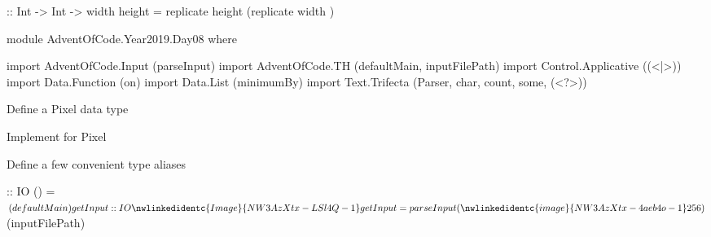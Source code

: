 \nwenddocs{}\endmoddef\nwstartdeflinemarkup{}\nwenddeflinemarkup
{} :: Int -> Int -> 
 width height = replicate height (replicate width )
\eatline
{}\nwendcode{}\nwdocspar


\nwenddocs{}\endmoddef\nwstartdeflinemarkup\nwenddeflinemarkup
module AdventOfCode.Year2019.Day08 where

import AdventOfCode.Input (parseInput)
import AdventOfCode.TH (defaultMain, inputFilePath)
import Control.Applicative ((<|>))
import Data.Function (on)
import Data.List (minimumBy)
import Text.Trifecta (Parser, char, count, some, (<?>))

\LA{}Define a Pixel data type~{\nwtagstyle{}}\RA{}

\LA{}Implement  for \code{}Pixel\edoc{}~{\nwtagstyle{}}\RA{}

\LA{}Define a few convenient type aliases~{\nwtagstyle{}}\RA{}

 :: IO ()
 = $(defaultMain)

getInput :: IO \nwlinkedidentc{Image}{NW3AzXtx-LSl4Q-1}
getInput = parseInput (\nwlinkedidentc{image}{NW3AzXtx-4aeb4o-1} 25 6) $(inputFilePath)

